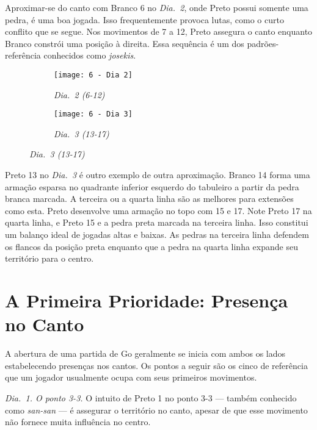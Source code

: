Aproximar-se do canto com Branco 6 no \emph{Dia.\@~2}, onde Preto possui somente uma pedra, é uma boa jogada. Isso frequentemente provoca lutas, como o curto conflito que se segue. Nos movimentos de 7 a 12, Preto assegura  o canto enquanto Branco constrói uma posição à direita. Essa sequência é um dos padrões-referência conhecidos como \emph{josekis}.

\begin{figure}[h!]
    \centering
    \begin{subfigure}[t]{.495\textwidth}
        \centering
        \texttt{[image: 6 - Dia 2]}
        \captionsetup{justification=centering}
        \caption*{\emph{Dia.\@~2 (6-12)}}
    \end{subfigure}
    \hfill
    \begin{subfigure}[t]{.495\textwidth}
        \centering
        \texttt{[image: 6 - Dia 3]}
        \captionsetup{justification=centering}
        \caption*{\emph{Dia.\@~3 (13-17)}}
    \end{subfigure}
\end{figure}

Preto 13 no \emph{Dia.\@~3} é outro exemplo de outra aproximação. Branco 14 forma uma armação esparsa no quadrante inferior esquerdo do tabuleiro a partir da pedra branca marcada. A terceira ou a quarta linha são as melhores para extensões como esta. Preto desenvolve uma armação no topo com 15 e 17. Note Preto 17 na quarta linha, e Preto 15 e a pedra preta marcada na terceira linha. Isso constitui um balanço ideal de jogadas altas e baixas. As pedras na terceira linha defendem os flancos da posição preta enquanto que a pedra na quarta linha expande seu território para o centro.

\pagebreak

\section{A Primeira Prioridade: Presença no Canto}

A abertura de uma partida de Go geralmente se inicia com ambos os lados estabelecendo presenças nos cantos. Os pontos a seguir são os cinco de referência que um jogador usualmente ocupa com seus primeiros movimentos.

\emph{Dia.\@~1. O ponto 3-3.} O intuito de Preto 1 no ponto 3-3 --- também conhecido como \emph{san-san} --- é assegurar o território no canto, apesar de que esse movimento não fornece muita influência no centro.

